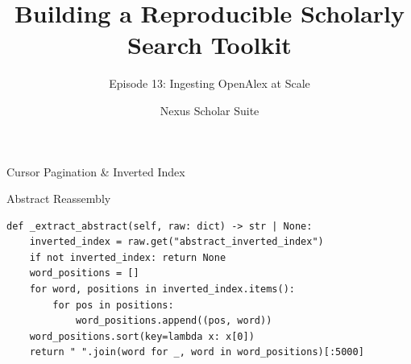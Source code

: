 \documentclass[aspectratio=169]{beamer}
\title{Building a Reproducible Scholarly Search Toolkit}
\subtitle{Episode 13: Ingesting OpenAlex at Scale}
\author{Nexus Scholar Suite}
\date{}
\begin{document}
\begin{frame}[plain]
  \titlepage
\end{frame}

\begin{frame}{Cursor Pagination \& Inverted Index}
  \begin{center}
  \end{center}
\end{frame}

\begin{frame}[fragile]{Abstract Reassembly}
\begin{lstlisting}[style=nexuspython]
def _extract_abstract(self, raw: dict) -> str | None:
    inverted_index = raw.get("abstract_inverted_index")
    if not inverted_index: return None
    word_positions = []
    for word, positions in inverted_index.items():
        for pos in positions:
            word_positions.append((pos, word))
    word_positions.sort(key=lambda x: x[0])
    return " ".join(word for _, word in word_positions)[:5000]
\end{lstlisting}
\end{frame}
\end{document}
